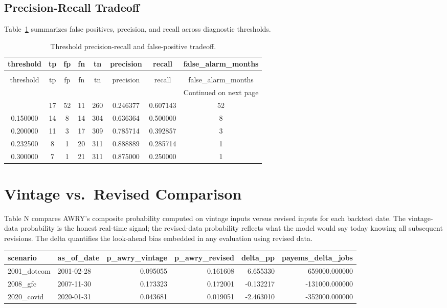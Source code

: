 \documentclass[conference,onecolumn]{IEEEtran}
\begin{document}
\subsection{Precision-Recall Tradeoff}
Table~\ref{tab:pr_tradeoff} summarizes false positives, precision, and recall across diagnostic thresholds.
\begin{longtable}{|c|c|c|c|c|c|c|c|}
\caption{Threshold precision-recall and false-positive tradeoff.} \label{tab:pr_tradeoff} \\
\toprule
threshold & tp & fp & fn & tn & precision & recall & false\_alarm\_months \\
\midrule
\endfirsthead
\caption[]{Threshold precision-recall and false-positive tradeoff.} \\
\toprule
threshold & tp & fp & fn & tn & precision & recall & false\_alarm\_months \\
\midrule
\endhead
\midrule
\multicolumn{8}{r}{Continued on next page} \\
\midrule
\endfoot
\bottomrule
\endlastfoot
0.100000 & 17 & 52 & 11 & 260 & 0.246377 & 0.607143 & 52 \\
0.150000 & 14 & 8 & 14 & 304 & 0.636364 & 0.500000 & 8 \\
0.200000 & 11 & 3 & 17 & 309 & 0.785714 & 0.392857 & 3 \\
0.232500 & 8 & 1 & 20 & 311 & 0.888889 & 0.285714 & 1 \\
0.300000 & 7 & 1 & 21 & 311 & 0.875000 & 0.250000 & 1 \\
\end{longtable}

\section{Vintage vs.\ Revised Comparison}
Table N compares AWRY's composite probability computed on vintage inputs versus revised inputs for each backtest date. The vintage-data probability is the honest real-time signal; the revised-data probability reflects what the model would say today knowing all subsequent revisions. The delta quantifies the look-ahead bias embedded in any evaluation using revised data.
\begin{tabular}{|l|l|r|r|r|r|}
\toprule
scenario & as\_of\_date & p\_awry\_vintage & p\_awry\_revised & delta\_pp & payems\_delta\_jobs \\
\midrule
2001\_dotcom & 2001-02-28 & 0.095055 & 0.161608 & 6.655330 & 659000.000000 \\
2008\_gfc & 2007-11-30 & 0.173323 & 0.172001 & -0.132217 & -131000.000000 \\
2020\_covid & 2020-01-31 & 0.043681 & 0.019051 & -2.463010 & -352000.000000 \\
\bottomrule
\end{tabular}
\end{document}
